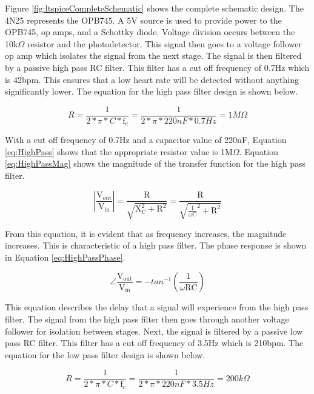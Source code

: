 \documentclass[CMPE]{KGCOEReport}
\begin{document}
Figure \ref{fig:ltspiceCompleteSchematic} shows the complete schematic design. The 4N25 represents the OPB745. A 5V source is used to provide power to the OPB745, op amps, and a Schottky diode. Voltage division occurs between the 10k$\Omega$ resistor and the photodetector. This signal then goes to a voltage follower op amp which isolates the signal from the next stage. The signal is then filtered by a passive high pass RC filter. This filter has a cut off frequency of 0.7Hz which is 42bpm. This ensures that a low heart rate will be detected without anything significantly lower. The equation for the high pass filter design is shown below.

\begin{equation}
R = \frac{1}{2*\pi*C*\text{f}_\text{c}} = \frac{1}{2*\pi*220nF*0.7Hz} = 1M\Omega \label{eq:HighPass}
\end{equation}

With a cut off frequency of 0.7Hz and a capacitor value of 220nF, Equation \ref{eq:HighPass} shows that the appropriate resistor value is 1M$\Omega$. Equation \ref{eq:HighPassMag} shows the magnitude of the transfer function for the high pass filter.

\begin{equation}
|\frac{\text{V}_\text{out}}{\text{V}_\text{in}}| = \frac{\text{R}}{\sqrt{\text{X}_\text{C}^2 + \text{R}^2}} = \frac{\text{R}}{\sqrt{\frac{1}{\omega\text{C}}^2 + \text{R}^2}} \label{eq:HighPassMag}
\end{equation}

From this equation, it is evident that as frequency increases, the magnitude increases. This is characteristic of a high pass filter. The phase response is shown in Equation \ref{eq:HighPassPhase}.

\begin{equation}
\angle\frac{\text{V}_\text{out}}{\text{V}_\text{in}} = -tan^{-1}(\frac{1}{\omega\text{R}\text{C}}) \label{eq:HighPassPhase}
\end{equation}

This equation describes the delay that a signal will experience from the high pass filter. The signal from the high pass filter then goes through another voltage follower for isolation between stages. Next, the signal is filtered by a passive low pass RC filter. This filter has a cut off frequency of 3.5Hz which is 210bpm.  The equation for the low pass filter design is shown below.

\begin{equation}
R = \frac{1}{2*\pi*C*\text{f}_\text{c}} = \frac{1}{2*\pi*220nF*3.5Hz} = 200k\Omega \label{eq:LowPass}
\end{equation}
\end{document}
